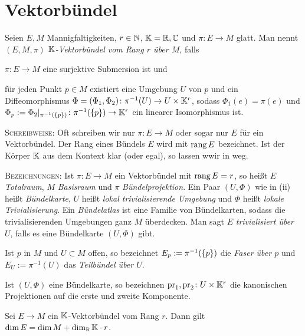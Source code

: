 \section{Vektorbündel}
\label{sec:faserbl}

\begin{definition}
  Seien $E,M$ Mannigfaltigkeiten, $r\in\mathbb{N}$, $\mathbb{K}=\mathbb{R},\mathbb{C}$ und $\pi\colon E \to M$ glatt. Man
  nennt $(E,M,\pi)$ \emph{$\mathbb{K}$-Vektorbündel vom Rang $r$ über $M$}, falls
  \begin{properties}
  \item $\pi\colon E \to M$ eine surjektive Submersion ist und
  \item für jeden Punkt $p\in M$ existiert eine Umgebung $U$ von $p$
    und ein Diffeomorphismus $\Phi = (\Phi_1,\Phi_2) \colon \pi^{-1}(U) \to U\times \mathbb{K}^r$,
    sodass $\Phi_1(e) = \pi(e)$ und $\Phi_p :=
    \Phi_2|_{\pi^{-1}(\left\lbrace p \right\rbrace)} \colon \pi^{-1}(\left\lbrace p \right\rbrace) \to \mathbb{K}^r$
    ein linearer Isomorphismus ist.
  \end{properties}
  \textsc{Schreibweise:} Oft schreiben wir nur $\pi\colon
  E\to M$ oder sogar nur $E$ für ein Vektorbündel. Der Rang eines
  Bündels $E$ wird mit $\operatorname{rang} E$ bezeichnet. Ist der Körper $\mathbb{K}$ aus
  dem Kontext klar (oder egal), so lassen wwir in weg.

  \textsc{Bezeichnungen:} Ist $\pi\colon E\to M$ ein Vektorbündel mit
  $\operatorname{rang} E = r$, so heißt $E$ \emph{Totalraum}, $M$ \emph{Basisraum} und
  $\pi$ \emph{Bündelprojektion}. Ein Paar $(U,\Phi)$ wie in (ii)
  heißt \emph{Bündelkarte}, $U$ heißt \emph{lokal trivialisierende
    Umgebung} und $\Phi$ heißt \emph{lokale Trivialisierung}. Ein
  \emph{Bündelatlas} ist eine Familie von Bündelkarten, sodass die
  trivialisierenden Umgebungen ganz $M$ überdecken. Man sagt $E$
  \emph{trivialisiert über $U$}, falls es eine Bündelkarte $(U,\Phi)$ gibt.

  Ist $p$ in $M$ und $U\subset M$ offen, so bezeichnet $E_p :=
  \pi^{-1}(\left\lbrace p \right\rbrace)$ die \emph{Faser über  $p$} und $E_U :=
  \pi^{-1}(U)$ das \emph{Teilbündel über $U$}.

  Ist $(U,\Phi)$ eine Bündelkarte, so bezeichnen $\operatorname{pr}_1,\operatorname{pr}_2\colon
  U\times \mathbb{K}^r$ die kanonischen Projektionen auf die erste und zweite Komponente.
\end{definition}

\begin{proposition}
  Sei $E\to M$ ein $\mathbb{K}$-Vektorbündel vom Rang $r$. Dann gilt $\dim E =
  \dim M + \dim_{\mathbb{R}}\mathbb{K}\cdot r$.
\end{proposition}


